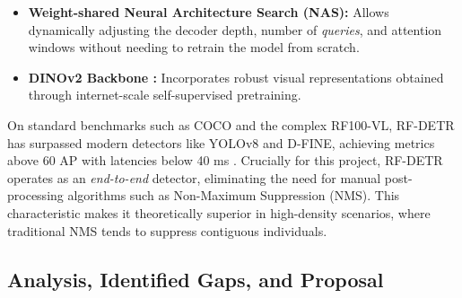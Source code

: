 \begin{itemize}
    \item \textbf{Weight-shared Neural Architecture Search (NAS):} Allows dynamically adjusting the decoder depth, number of \textit{queries}, and attention windows without needing to retrain the model from scratch.
    \item \textbf{DINOv2 Backbone \cite{dinov2}:} Incorporates robust visual representations obtained through internet-scale self-supervised pretraining.
\end{itemize}

On standard benchmarks such as COCO and the complex RF100-VL, RF-DETR has surpassed modern detectors like YOLOv8 and D-FINE, achieving metrics above 60 AP with latencies below 40 ms \cite{rf-detr}. Crucially for this project, RF-DETR operates as an \textit{end-to-end} detector, eliminating the need for manual post-processing algorithms such as Non-Maximum Suppression (NMS). This characteristic makes it theoretically superior in high-density scenarios, where traditional NMS tends to suppress contiguous individuals.

\subsection{Analysis, Identified Gaps, and Proposal}

